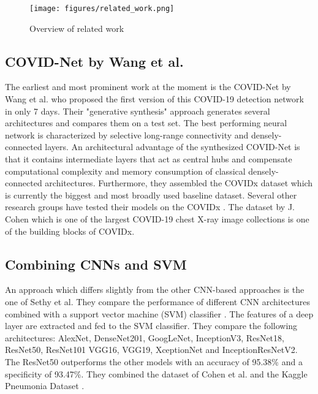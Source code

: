 \documentclass[conference]{IEEEtran}
\begin{document}
\begin{figure}
	\centering
	\texttt{[image: figures/related\_work.png]}
	\caption{Overview of related work}
	\label{fig:related_work}
\end{figure}

\subsection{COVID-Net by Wang et al.}

The earliest and most prominent work at the moment is the COVID-Net by Wang et al. \cite{wang2020covid} who proposed the first version of this COVID-19 detection network in only 7 days. Their "generative synthesis" approach generates several architectures and compares them on a test set. The best performing neural network is characterized by selective long-range connectivity and densely-connected layers. An architectural advantage of the synthesized COVID-Net is that it contains intermediate layers that act as central hubs and compensate computational complexity and memory consumption of classical densely-connected architectures. Furthermore, they assembled the COVIDx dataset which is currently the biggest and most broadly used baseline dataset. Several other research groups have tested their models on the COVIDx \cite{hemdan2020covidx} \cite{farooq2020covid} \cite{khobahi2020coronet}. The dataset by J. Cohen \cite{cohen2020covid} which is one of the largest COVID-19 chest X-ray image collections is one of the building blocks of COVIDx.

\subsection{Combining CNNs and SVM}
An approach which differs slightly from the other CNN-based approaches is the one of Sethy et al. They compare the performance of different CNN architectures combined with a support vector machine (SVM) classifier \cite{sethy2020detection}. The features of a deep layer are extracted and fed to the SVM classifier. They compare the following architectures: AlexNet, DenseNet201, GoogLeNet, InceptionV3, ResNet18, ResNet50, ResNet101 VGG16, VGG19, XceptionNet and InceptionResNetV2. The ResNet50 outperforms the other models with an accuracy of 95.38\% and a specificity of 93.47\%. They combined the dataset of Cohen et al. \cite{cohen2020covid} and the Kaggle Pneumonia Dataset \cite{kaggle2019pneumonia}.
\end{document}
